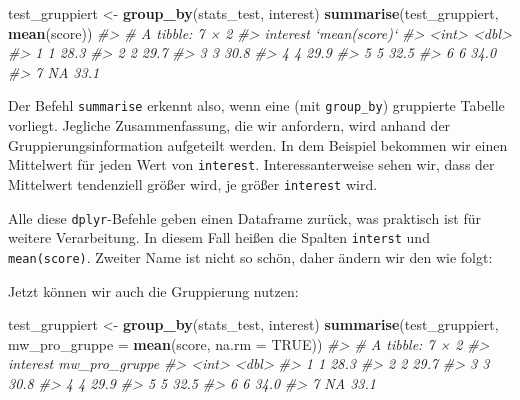 \documentclass[12pt,]{book}
\newenvironment{Shaded}{\begin{snugshade}}{\end{snugshade}}
\newcommand{\KeywordTok}[1]{\textcolor[rgb]{0.13,0.29,0.53}{\textbf{{#1}}}}
\newcommand{\DataTypeTok}[1]{\textcolor[rgb]{0.13,0.29,0.53}{{#1}}}
\newcommand{\StringTok}[1]{\textcolor[rgb]{0.31,0.60,0.02}{{#1}}}
\newcommand{\CommentTok}[1]{\textcolor[rgb]{0.56,0.35,0.01}{\textit{{#1}}}}
\newcommand{\OtherTok}[1]{\textcolor[rgb]{0.56,0.35,0.01}{{#1}}}
\newcommand{\NormalTok}[1]{{#1}}
\begin{document}
\begin{Shaded}
\begin{Highlighting}[]
\NormalTok{test_gruppiert <-}\StringTok{ }\KeywordTok{group_by}\NormalTok{(stats_test, interest)}
\KeywordTok{summarise}\NormalTok{(test_gruppiert, }\KeywordTok{mean}\NormalTok{(score))}
\CommentTok{#> # A tibble: 7 × 2}
\CommentTok{#>   interest `mean(score)`}
\CommentTok{#>      <int>         <dbl>}
\CommentTok{#> 1        1          28.3}
\CommentTok{#> 2        2          29.7}
\CommentTok{#> 3        3          30.8}
\CommentTok{#> 4        4          29.9}
\CommentTok{#> 5        5          32.5}
\CommentTok{#> 6        6          34.0}
\CommentTok{#> 7       NA          33.1}
\end{Highlighting}
\end{Shaded}

Der Befehl \texttt{summarise} erkennt also, wenn eine (mit
\texttt{group\_by}) gruppierte Tabelle vorliegt. Jegliche
Zusammenfassung, die wir anfordern, wird anhand der
Gruppierungsinformation aufgeteilt werden. In dem Beispiel bekommen wir
einen Mittelwert für jeden Wert von \texttt{interest}.
Interessanterweise sehen wir, dass der Mittelwert tendenziell größer
wird, je größer \texttt{interest} wird.

Alle diese \texttt{dplyr}-Befehle geben einen Dataframe zurück, was
praktisch ist für weitere Verarbeitung. In diesem Fall heißen die
Spalten \texttt{interst} und \texttt{mean(score)}. Zweiter Name ist
nicht so schön, daher ändern wir den wie folgt:

Jetzt können wir auch die Gruppierung nutzen:

\begin{Shaded}
\begin{Highlighting}[]
\NormalTok{test_gruppiert <-}\StringTok{ }\KeywordTok{group_by}\NormalTok{(stats_test, interest)}
\KeywordTok{summarise}\NormalTok{(test_gruppiert, }\DataTypeTok{mw_pro_gruppe =} \KeywordTok{mean}\NormalTok{(score, }\DataTypeTok{na.rm =} \OtherTok{TRUE}\NormalTok{))}
\CommentTok{#> # A tibble: 7 × 2}
\CommentTok{#>   interest mw_pro_gruppe}
\CommentTok{#>      <int>         <dbl>}
\CommentTok{#> 1        1          28.3}
\CommentTok{#> 2        2          29.7}
\CommentTok{#> 3        3          30.8}
\CommentTok{#> 4        4          29.9}
\CommentTok{#> 5        5          32.5}
\CommentTok{#> 6        6          34.0}
\CommentTok{#> 7       NA          33.1}
\end{Highlighting}
\end{Shaded}
\end{document}
